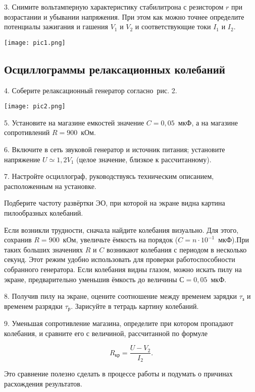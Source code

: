 3. Снимите вольтамперную характеристику стабилитрона с резистором $r$ при возрастании и убывании напряжения. При этом как можно точнее определите потенциалы зажигания и гашения $V_1$ и $V_2$ и соответствующие токи $I_1$ и $I_2$.
\begin{center}
\texttt{[image: pic1.png]}
\end{center}
\subsection{\label{sec:level2}Осциллограммы релаксационных колебаний}

4. Соберите релаксационный генератор согласно~рис. 2.

\texttt{[image: pic2.png]}


5. Установите на магазине емкостей значение $C = 0,05$~мкФ, а на магазине сопротивлений	$R = 900$~кОм.

6. Включите в сеть звуковой генератор и источник питания; установите напряжение $U \simeq 1,2V_1$ (целое значение, близкое к рассчитанному).

7. Настройте осциллограф, руководствуясь техническим описанием, расположенным на установке.

Подберите частоту развёртки ЭО, при которой на экране видна картина пилообразных колебаний.

Если возникли трудности, сначала найдите колебания визуально. Для этого, сохранив $R = 900$~кОм, увеличьте ёмкость на порядок ($C = n \cdot 10^{-1}$~мкФ).При
таких больших значениях $R$ и $C$ возникают колебания с периодом в несколько секунд. Этот режим удобно использовать для проверки работоспособности собранного генератора. Если колебания видны глазом, можно искать пилу на экране, предварительно уменьшив ёмкость до величины $С = 0,05$~мкФ.

8. Получив пилу на экране, оцените соотношение между временем зарядки $\tau_{\text{з}}$ и временем разрядки $\tau_{\text{р}}$. Зарисуйте в тетрадь картину колебаний.

9. Уменьшая сопротивление магазина, определите при котором пропадают колебания, и сравните его с величиной, рассчитанной по формуле

\begin{equation}\label{1}
    R_{\text{кр}} = \frac{U - V_2}{I_2}. 
\end{equation}

Это сравнение полезно сделать в процессе работы и подумать о причинах расхождения результатов.

